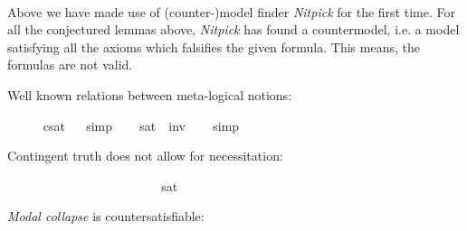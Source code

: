 \begin{isabellebody}
%
\ %
%
\isamarkupfalse%
\ %
%
%
%
%
\begin{isamarkuptext}%
Above we have made use of (counter-)model finder \emph{Nitpick} \cite{Nitpick} for the first time.  
For all the conjectured lemmas above, \emph{Nitpick} has found a countermodel, i.e. a model satisfying all 
the axioms which falsifies the given formula. This means, the formulas are not valid.%
\end{isamarkuptext}\isamarkuptrue%
%
\begin{isamarkuptext}%
Well known relations between meta-logical notions:%
\end{isamarkuptext}\isamarkuptrue%
\ \isamarkupfalse%
\ \ {\isachardoublequoteopen}{\isasymlfloor}{\isasymphi}{\isasymrfloor}\ {\isasymlongleftrightarrow}\ {\isasymnot}{\isasymlfloor}{\isasymphi}{\isasymrfloor}\isactrlsup c\isactrlsup s\isactrlsup a\isactrlsup t{\isachardoublequoteclose}%
\ %
%
\isamarkupfalse%
\ simp%
%
%
\isanewline
\ \isamarkupfalse%
\ \ {\isachardoublequoteopen}{\isasymlfloor}{\isasymphi}{\isasymrfloor}\isactrlsup s\isactrlsup a\isactrlsup t\ {\isasymlongleftrightarrow}\ {\isasymnot}{\isasymlfloor}{\isasymphi}{\isasymrfloor}\isactrlsup i\isactrlsup n\isactrlsup v\ {\isachardoublequoteclose}%
\ %
%
\isamarkupfalse%
\ simp%
%
%
%
\begin{isamarkuptext}%
Contingent truth does not allow for necessitation:%
\end{isamarkuptext}\isamarkuptrue%
\ \isamarkupfalse%
\ {\isachardoublequoteopen}{\isasymlfloor}\isactrlbold {\isasymdiamond}{\isasymphi}{\isasymrfloor}\ \ {\isasymlongrightarrow}\ {\isasymlfloor}\isactrlbold {\isasymbox}{\isasymphi}{\isasymrfloor}{\isachardoublequoteclose}\ \isamarkupfalse%
%
\ %
%
\isamarkupfalse%
\ \ \ \ \ \ \ \ \ \ \ \ %
%
%
%
\isanewline
\ \isamarkupfalse%
\ {\isachardoublequoteopen}{\isasymlfloor}\isactrlbold {\isasymbox}{\isasymphi}{\isasymrfloor}\isactrlsup s\isactrlsup a\isactrlsup t\ {\isasymlongrightarrow}\ {\isasymlfloor}\isactrlbold {\isasymbox}{\isasymphi}{\isasymrfloor}{\isachardoublequoteclose}\ \isamarkupfalse%
%
\ %
%
\isamarkupfalse%
\ \ \ \ \ \ \ \ \ \ \ %
%
%
%
%
\begin{isamarkuptext}%
\emph{Modal collapse} is countersatisfiable:%
\end{isamarkuptext}\isamarkuptrue%

\end{isabellebody}
